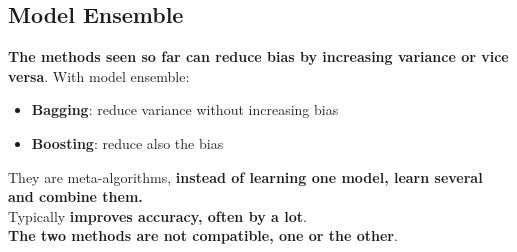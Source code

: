 \subsection{Model Ensemble}
    \textbf{The methods seen so far can reduce bias by increasing variance or vice versa}. With model ensemble:
    \begin{itemize}
        \item \textbf{Bagging}: reduce variance without increasing bias
        \item \textbf{Boosting}: reduce also the bias
    \end{itemize}
    They are meta-algorithms, \textbf{instead of learning one model, learn several and combine them.}\\
    Typically \textbf{improves accuracy, often by a lot}.\\
    \textbf{The two methods are not compatible, one or the other}.
